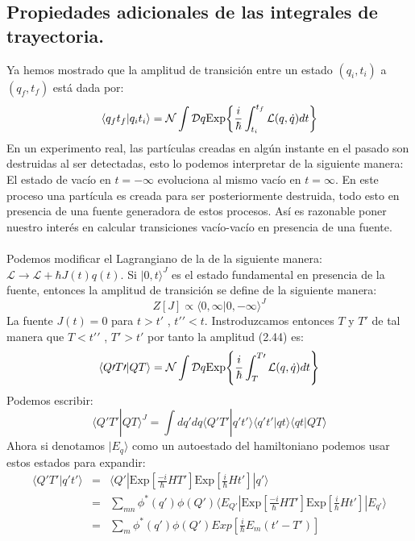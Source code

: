 \subsection{Propiedades adicionales de las integrales de trayectoria.}
Ya hemos mostrado que la amplitud de transición entre un estado $(q_i,t_i)$ a $(q_f,t_f)$ está dada por:
\begin{equation}
\langle q_{f}t_{f}|q_it_i\rangle=\mathcal{N}\int\mathcal{D}q\text{Exp\ensuremath{\left\{ \frac{i}{\hbar}\int_{t_{i}}^{t_{f}}\mathcal{L}(q,\dot{q})dt\right\} }}
\end{equation}
En un experimento real, las partículas creadas en algún instante en el pasado son destruidas al ser detectadas, esto lo podemos interpretar de la siguiente manera: El estado de vacío en $t=-\infty$ evoluciona al mismo vacío en $t=\infty$. En este proceso una partícula es creada para ser posteriormente destruida, todo esto en presencia de una fuente generadora de estos procesos. Así es razonable poner nuestro interés en calcular transiciones vacío-vacío en presencia de una fuente.\\
\\
Podemos modificar el Lagrangiano de la de la siguiente manera: $\mathcal{L} \to \mathcal{L}+\hbar J(t)q(t)$. Si $|0,t\rangle^J $ es el estado fundamental en presencia de la fuente, entonces la amplitud de transición se define de la siguiente manera:
\begin{equation}
Z[J]\propto \langle 0,\infty|0,-\infty\rangle ^J
\end{equation}
La fuente $J(t)=0$ para $t>t\prime$ , $t\prime \prime < t$. Instroduzcamos entonces $T$ y $T\prime $ de tal manera que $T<t\prime\prime $ , $T\prime>t\prime $ por tanto la amplitud (2.44) es:
\begin{equation}
\langle 	Q\prime T\prime |QT\rangle=\mathcal{N}\int\mathcal{D}q\text{Exp\ensuremath{\left\{ \frac{i}{\hbar}\int_{T}^{T\prime}\mathcal{L}(q,\dot{q})dt\right\} }}
\end{equation}
Podemos escribir:
\begin{equation}
\langle Q\prime T\prime |QT \rangle^J=\int dq\prime dq\langle Q\prime T\prime | q\prime t\prime  \rangle\langle q\prime t\prime | qt \rangle\langle qt|QT \rangle
\end{equation}
Ahora si denotamos $|E_q\rangle$ como un autoestado del hamiltoniano podemos usar estos estados para expandir:
\begin{eqnarray}
\nonumber \langle Q\prime T\prime | q\prime t\prime  \rangle &=& \langle Q\prime|\text{Exp}\left[\frac{-i}{\hbar}HT\prime\right]\text{Exp}\left[\frac{i}{\hbar}Ht\prime\right]|q\prime\rangle\\
\nonumber &=& \sum_{mn}\phi^{*}(q\prime)\phi(Q\prime)\langle E_{Q\prime}|\text{Exp}\left[\frac{-i}{\hbar}HT\prime\right]\text{Exp}\left[\frac{i}{\hbar}Ht\prime\right]|E_{q\prime}\rangle\\
&=&\sum_{m}\phi^{*}(q\prime)\phi(Q\prime)Exp\left[\frac{i}{\hbar}E_{m}(t\prime-T\prime)\right]
\end{eqnarray}

